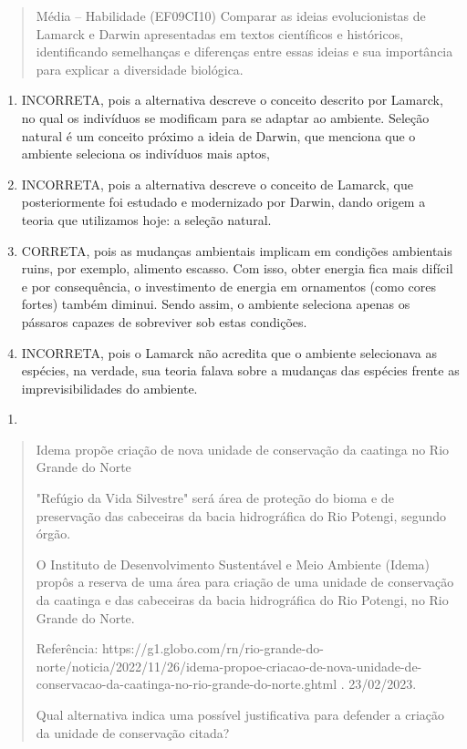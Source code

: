 \begin{quote}
Média -- Habilidade (EF09CI10) Comparar as ideias evolucionistas de
Lamarck e Darwin apresentadas em textos científicos e históricos,
identificando semelhanças e diferenças entre essas ideias e sua
importância para explicar a diversidade biológica.
\end{quote}

\begin{enumerate}
\def\labelenumi{(\Alph{enumi})}
\item
  INCORRETA, pois a alternativa descreve o conceito descrito por
  Lamarck, no qual os indivíduos se modificam para se adaptar ao
  ambiente. Seleção natural é um conceito próximo a ideia de Darwin, que
  menciona que o ambiente seleciona os indivíduos mais aptos,
\item
  INCORRETA, pois a alternativa descreve o conceito de Lamarck, que
  posteriormente foi estudado e modernizado por Darwin, dando origem a
  teoria que utilizamos hoje: a seleção natural.
\item
  CORRETA, pois as mudanças ambientais implicam em condições ambientais
  ruins, por exemplo, alimento escasso. Com isso, obter energia fica
  mais difícil e por consequência, o investimento de energia em
  ornamentos (como cores fortes) também diminui. Sendo assim, o ambiente
  seleciona apenas os pássaros capazes de sobreviver sob estas
  condições.
\item
  INCORRETA, pois o Lamarck não acredita que o ambiente selecionava as
  espécies, na verdade, sua teoria falava sobre a mudanças das espécies
  frente as imprevisibilidades do ambiente.
\end{enumerate}

\begin{enumerate}
\def\labelenumi{\arabic{enumi}.}
\item
\end{enumerate}

\begin{quote}
Idema propõe criação de nova unidade de conservação da caatinga no Rio
Grande do Norte

"Refúgio da Vida Silvestre" será área de proteção do bioma e de
preservação das cabeceiras da bacia hidrográfica do Rio Potengi, segundo
órgão.

O Instituto de Desenvolvimento Sustentável e Meio Ambiente (Idema)
propôs a reserva de uma área para criação de uma unidade de conservação
da caatinga e das cabeceiras da bacia hidrográfica do Rio Potengi, no
Rio Grande do Norte.

Referência:
https://g1.globo.com/rn/rio-grande-do-norte/noticia/2022/11/26/idema-propoe-criacao-de-nova-unidade-de-conservacao-da-caatinga-no-rio-grande-do-norte.ghtml
. 23/02/2023.

Qual alternativa indica uma possível justificativa para defender a
criação da unidade de conservação citada?
\end{quote}

